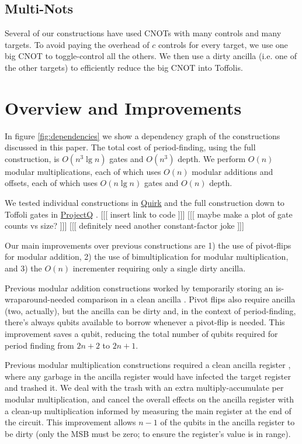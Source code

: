 \documentclass[twocolumn]{article}
\begin{document}
\subsection{Multi-Nots}

Several of our constructions have used CNOTs with many controls and many targets.
To avoid paying the overhead of $c$ controls for every target, we use one big CNOT to toggle-control all the others.
We then use a dirty ancilla (i.e. one of the other targets) to efficiently reduce the big CNOT into Toffolis.


\section{Overview and Improvements} \label{sec:costs}

In figure \ref{fig:dependencies} we show a dependency graph of the constructions discussed in this paper.
The total cost of period-finding, using the full construction, is $O(n^3 \lg n)$ gates and $O(n^3)$ depth.
We perform $O(n)$ modular multiplications, each of which uses $O(n)$ modular additions and offsets, each of which uses $O(n \lg n)$ gates \cite{haner2016} and $O(n)$ depth.

We tested individual constructions in \href{https://github.com/Strilanc/Quirk}{Quirk} and the full construction down to Toffoli gates in \href{https://github.com/ProjectQ-Framework/ProjectQ}{ProjectQ} \cite{projq2016}. [[[ insert link to code ]]] [[[ maybe make a plot of gate counts vs size? ]]] [[[ definitely need another constant-factor joke ]]]

Our main improvements over previous constructions are 1) the use of pivot-flips for modular addition, 2) the use of bimultiplication for modular multiplication, and 3) the $O(n)$ incrementer requiring only a single dirty ancilla.

Previous modular addition constructions worked by temporarily storing an is-wraparound-needed comparison in a clean ancilla \cite{takahashi2006, haner2016}.
Pivot flips also require ancilla (two, actually), but the ancilla can be dirty and, in the context of period-finding, there's always qubits available to borrow whenever a pivot-flip is needed.
This improvement saves a qubit, reducing the total number of qubits required for period finding from $2n+2$ to $2n+1$.

Previous modular multiplication constructions required a clean ancilla register \cite{haner2016}, where any garbage in the ancilla register would have infected the target register and trashed it.
We deal with the trash with an extra multiply-accumulate per modular multiplication, and cancel the overall effects on the ancilla register with a clean-up multiplication informed by measuring the main register at the end of the circuit.
This improvement allows $n-1$ of the qubits in the ancilla register to be dirty (only the MSB must be zero; to ensure the register's value is in range).
\end{document}
